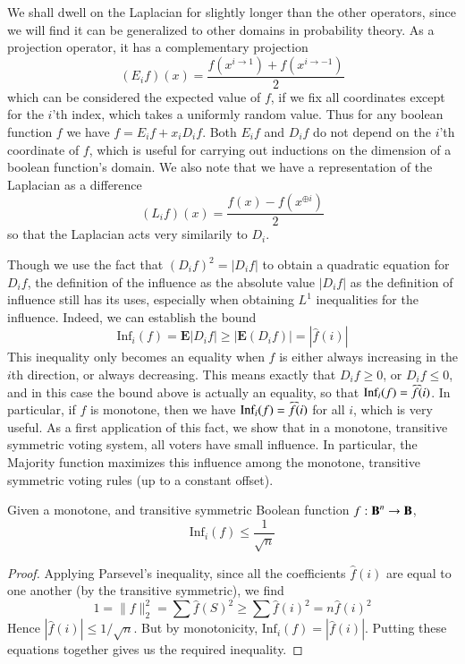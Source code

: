We shall dwell on the Laplacian for slightly longer than the other operators, since we will find it can be generalized to other domains in probability theory. As a projection operator, it has a complementary projection
%
\[ (E_i f)(x) = \frac{f(x^{i \to 1}) + f(x^{i \to -1})}{2} \]
%
which can be considered the expected value of $f$, if we fix all coordinates except for the $i$'th index, which takes a uniformly random value. Thus for any boolean function $f$ we have $f = E_i f + x_i D_i f$. Both $E_i f$ and $D_i f$ do not depend on the $i$'th coordinate of $f$, which is useful for carrying out inductions on the dimension of a boolean function's domain. We also note that we have a representation of the Laplacian as a difference
%
\[ (L_i f)(x) = \frac{f(x) - f(x^{\oplus i})}{2} \]
%
so that the Laplacian acts very similarily to $D_i$.

Though we use the fact that $(D_if)^2 = |D_if|$ to obtain a quadratic equation for $D_i f$, the definition of the influence as the absolute value $|D_if|$ as the definition of influence still has its uses, especially when obtaining $L^1$ inequalities for the influence. Indeed, we can establish the bound
%
\[ \text{Inf}_i(f) = \mathbf{E}|D_if| \geq \left| \mathbf{E}(D_i f) \right| = | \widehat{f}(i) | \]
%
This inequality only becomes an equality when $f$ is either always increasing in the $i$th direction, or always decreasing. This means exactly that $D_i f \geq 0$, or $D_i f \leq 0$, and in this case the bound above is actually an equality, so that $\text{Inf}_i(f) = \smash{\widehat{f}}(i)$. In particular, if $f$ is monotone, then we have $\text{Inf}_i(f) = \smash{\widehat{f}(i)}$ for all $i$, which is very useful. As a first application of this fact, we show that in a monotone, transitive symmetric voting system, all voters have small influence. In particular, the Majority function maximizes this influence among the monotone, transitive symmetric voting rules (up to a constant offset).

\begin{theorem}
    Given a monotone, and transitive symmetric Boolean function $f: \operatorname{\mathbf{B}}^n \to \operatorname{\mathbf{B}}$,
    \[ \text{Inf}_i(f) \leq \frac{1}{\sqrt{n}} \]
\end{theorem}
\begin{proof}
    Applying Parsevel's inequality, since all the coefficients $\widehat{f}(i)$ are equal to one another (by the transitive symmetric), we find
    \[ 1 = \| f \|_2^2 = \sum \widehat{f}(S)^2 \geq \sum \widehat{f}(i)^2 = n \widehat{f}(i)^2 \]
    Hence $|\widehat{f}(i)| \leq 1/\sqrt{n}$. But by monotonicity, $\text{Inf}_i(f) = |\widehat{f}(i)|$. Putting these equations together gives us the required inequality.
\end{proof}

